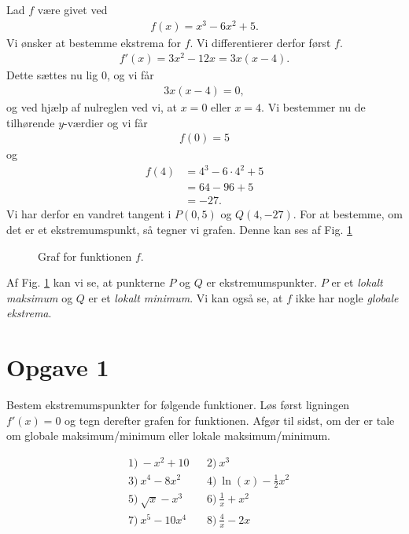 \begin{exa}
	Lad $f$ være givet ved
	\begin{align*}
		f(x) = x^3-6x^2+5.
	\end{align*}
	Vi ønsker at bestemme ekstrema for $f$. Vi differentierer derfor først $f$.
	\begin{align*}
		f'(x) = 3x^2-12x = 3x(x-4).
	\end{align*}
	Dette sættes nu lig $0$, og vi får
	\begin{align*}
		3x(x-4) = 0, 
	\end{align*}
	og ved hjælp af nulreglen ved vi, at $x=0$ eller $x = 4$. Vi bestemmer nu de tilhørende $y$-værdier og vi får
	\begin{align*}
		f(0) = 5
	\end{align*}
	og 
	\begin{align*}
		f(4) &= 4^3 - 6\cdot 4^2+5\\
		&= 64-96+5\\
		&= -27.
	\end{align*}
	Vi har derfor en vandret tangent i $P(0,5)$ og $Q(4,-27)$. For at bestemme, om det er et ekstremumspunkt, så tegner vi grafen. Denne kan ses af Fig. \ref{fig:ekstrema}
	\begin{figure}[H]
		\centering
		\caption{Graf for funktionen $f$.}
		\label{fig:ekstrema}
	\end{figure}
\end{exa}
Af Fig. \ref{fig:ekstrema} kan vi se, at punkterne $P$ og $Q$ er ekstremumspunkter. $P$ er et \textit{lokalt maksimum} og $Q$ er et \textit{lokalt minimum}. Vi kan også se, at $f$ ikke har nogle 
\textit{globale ekstrema}.



\section*{Opgave 1}

Bestem ekstremumspunkter for følgende funktioner. Løs først ligningen $f'(x)=0$ og tegn derefter grafen for funktionen.  Afgør til sidst, om der er tale om globale maksimum/minimum eller lokale maksimum/minimum.

\begin{align*}
	&1) \ -x^2+10    &&2) \  x^3     \\
	&3) \  x^4-8x^2   &&4) \ \ln(x) - \frac{1}{2}x^2      \\
	&5) \ \sqrt{x}-x^3    &&6) \   \frac{1}{x} +x^2    \\
	&7) \  x^5-10x^4   &&8) \ \frac{4}{x} - 2x      \\
\end{align*}